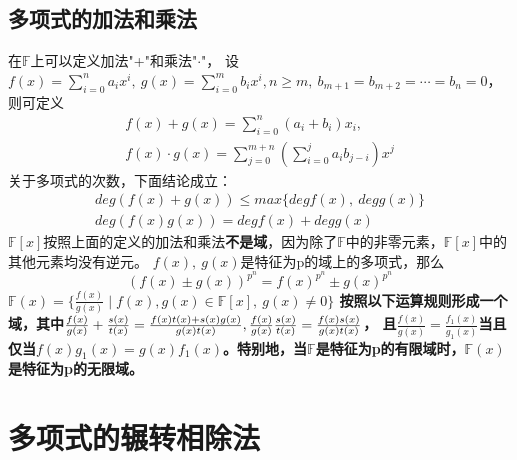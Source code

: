 \documentclass[cn,10pt]{elegantbook}
\begin{document}
\subsection{多项式的加法和乘法}
在$\mathbb{F}$上可以定义加法"+"和乘法"$\cdot$"，
设$f(x)= \sum_{i=0}^na_ix^i,\ g(x)= \sum_{i=0}^mb_ix^i,n \geq m,\ b_{m+1}= b_{m+2}=\cdots =b_n=0$，则可定义
\begin{align*}
  f(x)+g(x)=\sum_{i=0}^n(a_i+b_i)x_i,
  \\
  f(x) \cdot g(x)= \sum_{j=0}^{m+n}(\sum_{i=0}^ja_ib_{j-i})x^j
\end{align*}
关于多项式的次数，下面结论成立：
\begin{align*}
  deg(f(x)+g(x)) \leq max\{degf(x),\ degg(x)\}\\
  deg(f(x)g(x))=degf(x)+degg(x)
\end{align*}
$\mathbb{F}[x]$按照上面的定义的加法和乘法\textbf{不是域}，因为除了$\mathbb{F}$中的非零元素，$\mathbb{F}[x]$中的其他元素均没有逆元。
\vskip 0.5cm
$f(x),\ g(x)$是特征为p的域上的多项式，那么
\begin{equation*}
  (f(x) \pm g(x))^{p^n}=f(x)^{p^n} \pm g(x)^{p^n}
\end{equation*}
\vskip 0.5cm
\textbf{$\mathbb{F}(x)=\{\frac{f(x)}{g(x)} \mid f(x),g(x) \in \mathbb{F}[x],\ g(x) \neq 0 \}$
按照以下运算规则形成一个域，其中$\frac{f(x)}{g(x)}+\frac{s(x)}{t(x)}=\frac{f(x)t(x)+s(x)g(x)}{g(x)t(x)},\\ \frac{f(x)}{g(x)} \frac{s(x)}{t(x)}=\frac{f(x)s(x)}{g(x)t(x)}$，
且$\frac{f(x)}{g(x)}=\frac{f_1(x)}{g_1(x)}$当且仅当$f(x)g_1(x)= g(x)f_1(x)$。特别地，当$\mathbb{F}$是特征为p的有限域时，$\mathbb{F}(x)$是特征为p的无限域。}
\section{多项式的辗转相除法}
\end{document}
